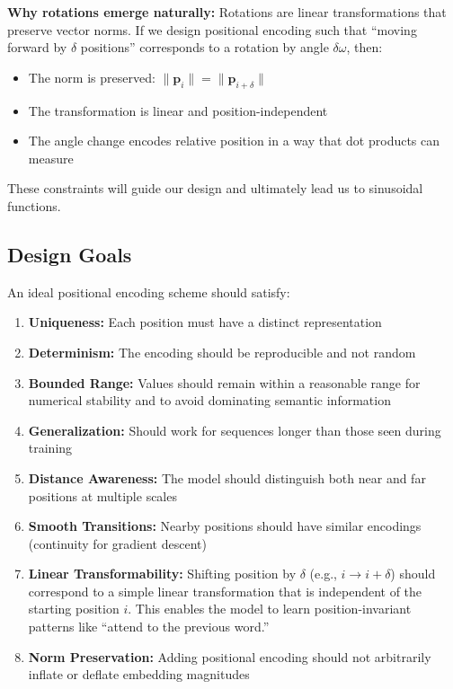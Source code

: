 \documentclass{article}
\begin{document}
\textbf{Why rotations emerge naturally:} Rotations are linear transformations that preserve vector norms. If we design positional encoding such that ``moving forward by $\delta$ positions'' corresponds to a rotation by angle $\delta \omega$, then:
\begin{itemize}
\item The norm is preserved: $\|\mathbf{p}_i\| = \|\mathbf{p}_{i+\delta}\|$
\item The transformation is linear and position-independent
\item The angle change encodes relative position in a way that dot products can measure
\end{itemize}

These constraints will guide our design and ultimately lead us to sinusoidal functions.

\subsection{Design Goals}

An ideal positional encoding scheme should satisfy:

\begin{enumerate}
\item \textbf{Uniqueness:} Each position must have a distinct representation
\item \textbf{Determinism:} The encoding should be reproducible and not random
\item \textbf{Bounded Range:} Values should remain within a reasonable range for numerical stability and to avoid dominating semantic information
\item \textbf{Generalization:} Should work for sequences longer than those seen during training
\item \textbf{Distance Awareness:} The model should distinguish both near and far positions at multiple scales
\item \textbf{Smooth Transitions:} Nearby positions should have similar encodings (continuity for gradient descent)
\item \textbf{Linear Transformability:} Shifting position by $\delta$ (e.g., $i \rightarrow i+\delta$) should correspond to a simple linear transformation that is independent of the starting position $i$. This enables the model to learn position-invariant patterns like ``attend to the previous word.''
\item \textbf{Norm Preservation:} Adding positional encoding should not arbitrarily inflate or deflate embedding magnitudes
\end{enumerate}
\end{document}
